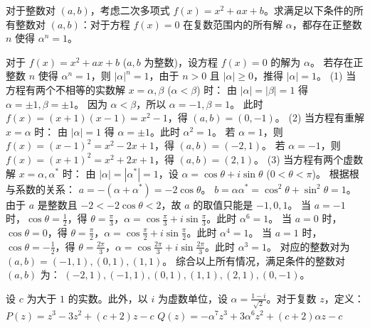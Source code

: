 \begin{questions}
\question
对于整数对 $(a, b)$，考虑二次多项式 $f(x) = x^2 + ax + b$。求满足以下条件的所有整数对 $(a, b)$：对于方程 $f(x) = 0$ 在复数范围内的所有解 $\alpha$，都存在正整数 $n$ 使得 $\alpha^n = 1$。
\begin{solution}
    对于 $f(x) = x^2 + ax + b$ ($a, b$ 为整数)，设方程 $f(x) = 0$ 的解为 $\alpha$。
    若存在正整数 $n$ 使得 $\alpha^n = 1$，则 $|\alpha|^n = 1$，由于 $n > 0$ 且 $|\alpha| \ge 0$，推得 $|\alpha| = 1$。
    (1) 当方程有两个不相等的实数解 $x = \alpha, \beta$ ($\alpha < \beta$) 时：
    由 $|\alpha| = |\beta| = 1$ 得 $\alpha = \pm 1, \beta = \pm 1$。
    因为 $\alpha < \beta$，所以 $\alpha = -1, \beta = 1$。
    此时 $f(x) = (x+1)(x-1) = x^2 - 1$，得 $(a, b) = (0, -1)$。
    (2) 当方程有重解 $x = \alpha$ 时：
    由 $|\alpha| = 1$ 得 $\alpha = \pm 1$。此时 $\alpha^2 = 1$。
    若 $\alpha = 1$，则 $f(x) = (x-1)^2 = x^2 - 2x + 1$，得 $(a, b) = (-2, 1)$。
    若 $\alpha = -1$，则 $f(x) = (x+1)^2 = x^2 + 2x + 1$，得 $(a, b) = (2, 1)$。
    (3) 当方程有两个虚数解 $x = \alpha, \alpha^*$ 时：
    由 $|\alpha| = |\alpha^*| = 1$，设 $\alpha = \cos \theta + i \sin \theta$ ($0 < \theta < \pi$)。
    根据根与系数的关系：
    $a = -(\alpha + \alpha^*) = -2\cos \theta$。
    $b = \alpha \alpha^* = \cos^2 \theta + \sin^2 \theta = 1$。
    由于 $a$ 是整数且 $-2 < -2\cos \theta < 2$，故 $a$ 的取值只能是 $-1, 0, 1$。
    当 $a = -1$ 时，$\cos \theta = \frac{1}{2}$，得 $\theta = \frac{\pi}{3}$，$\alpha = \cos \frac{\pi}{3} + i \sin \frac{\pi}{3}$。此时 $\alpha^6 = 1$。
    当 $a = 0$ 时，$\cos \theta = 0$，得 $\theta = \frac{\pi}{2}$，$\alpha = \cos \frac{\pi}{2} + i \sin \frac{\pi}{2}$。此时 $\alpha^4 = 1$。
    当 $a = 1$ 时，$\cos \theta = -\frac{1}{2}$，得 $\theta = \frac{2\pi}{3}$，$\alpha = \cos \frac{2\pi}{3} + i \sin \frac{2\pi}{3}$。此时 $\alpha^3 = 1$。
    对应的整数对为 $(a, b) = (-1, 1), (0, 1), (1, 1)$。
    综合以上所有情况，满足条件的整数对 $(a, b)$ 为：
    $(-2, 1), (-1, 1), (0, 1), (1, 1), (2, 1), (0, -1)$。
\end{solution}

\question
设 $c$ 为大于 $1$ 的实数。此外，以 $i$ 为虚数单位，设 $\alpha = \frac{1-i}{\sqrt{2}}$。对于复数 $z$，定义：
$P(z) = z^3 - 3z^2 + (c+2)z - c$
$Q(z) = -\alpha^7 z^3 + 3\alpha^6 z^2 + (c+2)\alpha z - c$
\begin{parts}

\end{parts}
\end{questions}
